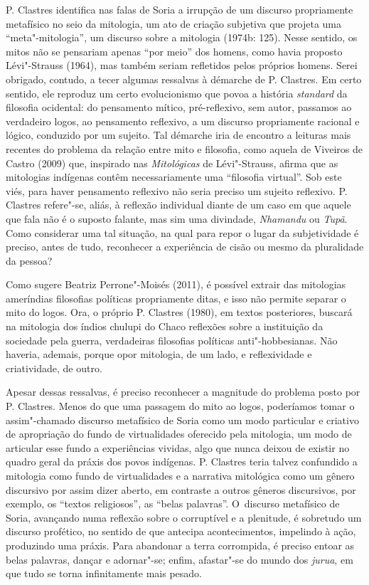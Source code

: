 P. Clastres identifica nas falas de Soria a irrupção de um discurso
propriamente metafísico no seio da mitologia, um ato de criação
subjetiva que projeta uma ``meta"-mitologia'', um discurso sobre a
mitologia (1974b: 125). Nesse sentido, os mitos não se pensariam apenas
``por meio'' dos homens, como havia proposto Lévi"-Strauss (1964), mas
também seriam refletidos pelos próprios homens. Serei obrigado,
contudo, a tecer algumas ressalvas à démarche de P. Clastres. Em certo
sentido, ele reproduz um certo evolucionismo que povoa a história
\emph{standard} da filosofia ocidental: do pensamento mítico, pré-reflexivo,
sem autor, passamos ao verdadeiro logos, ao pensamento reflexivo, a um
discurso propriamente racional e lógico, conduzido por um sujeito. Tal
démarche iria de encontro a leituras mais recentes do problema da
relação entre mito e filosofia, como aquela de Viveiros de Castro
(2009) que, inspirado nas \emph{Mitológicas} de Lévi"-Strauss, afirma que as
mitologias indígenas contêm necessariamente uma ``filosofia virtual''.
Sob este viés, para haver pensamento reflexivo não seria preciso um
sujeito reflexivo. P. Clastres refere"-se, aliás, à reflexão individual
diante de um caso em que aquele que fala não é o suposto falante, mas
sim uma divindade, \emph{Nhamandu} ou \emph{Tupã}. Como considerar uma tal situação,
na qual para repor o lugar da subjetividade é preciso, antes de tudo,
reconhecer a experiência de cisão ou mesmo da pluralidade da pessoa?

Como sugere Beatriz Perrone"-Moisés (2011), é possível extrair das
mitologias ameríndias filosofias políticas propriamente ditas, e isso
não permite separar o mito do logos. Ora, o próprio P. Clastres (1980),
em textos posteriores, buscará na mitologia dos índios chulupi do Chaco
reflexões sobre a instituição da sociedade pela guerra, verdadeiras
filosofias políticas anti"-hobbesianas. Não haveria, ademais, porque opor
mitologia, de um lado, e reflexividade e criatividade, de outro.

Apesar dessas ressalvas, é preciso reconhecer a magnitude do problema
posto por P. Clastres. Menos do que uma passagem do mito ao logos,
poderíamos tomar o assim"-chamado discurso metafísico de Soria como um
modo particular e criativo de apropriação do fundo de virtualidades
oferecido pela mitologia, um modo de articular esse fundo a
experiências vividas, algo que nunca deixou de existir no quadro geral
da práxis dos povos indígenas. P. Clastres teria talvez confundido a
mitologia como fundo de virtualidades e a narrativa mitológica como um
gênero discursivo por assim dizer aberto, em contraste a outros gêneros
discursivos, por exemplo, os ``textos religiosos'', as ``belas palavras''.
O~discurso metafísico de Soria, avançando numa reflexão sobre o
corruptível e a plenitude, é sobretudo um discurso profético, no
sentido de que antecipa acontecimentos, impelindo à ação, produzindo
uma práxis. Para abandonar a terra corrompida, é preciso entoar as
belas palavras, dançar e adornar"-se; enfim, afastar"-se do mundo dos
\emph{jurua}, em que tudo se torna infinitamente mais pesado. 

